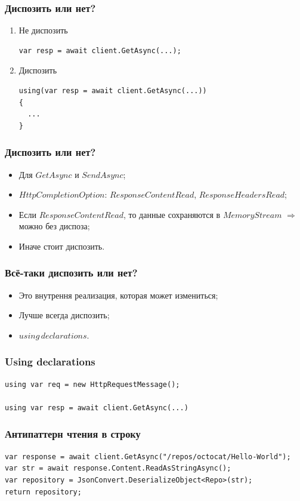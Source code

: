 \documentclass[17pt,aspectratio=169]{beamer}
\begin{document}
\begin{frame}[fragile]
\frametitle{Диспозить или нет?}
\begin{enumerate}
	\item <1-> Не диспозить
\begin{lstlisting}
var resp = await client.GetAsync(...);
\end{lstlisting}
	\item <2-> Диспозить
\begin{lstlisting}
using(var resp = await client.GetAsync(...))
{
  ...                
}
\end{lstlisting}
\end{enumerate}
\end{frame}

\begin{frame}
\frametitle{Диспозить или нет?}
\begin{itemize}
	\item <1-> Для $GetAsync$ и $SendAsync$;
	\item <2-> $HttpCompletionOption$: $ResponseContentRead$, $ResponseHeadersRead$;
	\item <3-> Если $ResponseContentRead$, то данные сохраняются в $MemoryStream$ $\Rightarrow$ можно без диспоза;
	\item <4-> Иначе стоит диспозить. 
\end{itemize}
\end{frame}

\begin{frame}
\frametitle{Всё-таки диспозить или нет?}
\begin{itemize}
	\item <1-> Это внутрення реализация, которая может измениться;
	\item <2-> Лучше всегда диспозить;
	\item <3-> $using\,declarations$.
\end{itemize}
\end{frame}

\begin{frame}[fragile]
\frametitle{Using declarations}
\begin{lstlisting}
using var req = new HttpRequestMessage();

using var resp = await client.GetAsync(...)
\end{lstlisting}
\end{frame}

\begin{frame}[fragile]
\frametitle{Антипаттерн чтения в строку}
\begin{lstlisting}
var response = await client.GetAsync("/repos/octocat/Hello-World");
var str = await response.Content.ReadAsStringAsync();
var repository = JsonConvert.DeserializeObject<Repo>(str);
return repository;
\end{lstlisting}
\end{frame}
\end{document}
